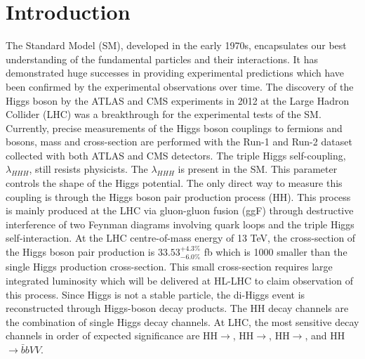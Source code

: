 \newpage
\chapter{Introduction}
\label{Intro}

The Standard Model (SM), developed in the early 1970s, encapsulates our best understanding of the fundamental particles and their interactions. It has demonstrated huge successes in providing experimental predictions which have been confirmed by the experimental observations over time. The discovery of the Higgs boson by the ATLAS and CMS experiments in 2012 at the Large Hadron Collider (LHC) was a breakthrough for the experimental tests of the SM. Currently, precise measurements of the Higgs boson couplings to fermions and bosons, mass and cross-section are performed with the Run-1 and Run-2 dataset collected with both ATLAS and CMS detectors. The triple Higgs self-coupling, $\lambda_{HHH}$, still resists physicists. The $\lambda_{HHH}$ is present in the SM. This parameter controls the shape of the Higgs potential. The only direct way to measure this coupling is through the Higgs boson pair production process (HH). This process is mainly produced at the LHC via gluon-gluon fusion (ggF) through destructive interference of two Feynman diagrams involving quark loops and the triple Higgs self-interaction. At the LHC centre-of-mass energy of 13 TeV, the cross-section of the Higgs boson pair production is $33.53_{-6.0\%}^{+4.3\%}$ fb which is 1000 smaller than the single Higgs production cross-section. This small cross-section requires large integrated luminosity which will be delivered at HL-LHC to claim observation of this process. Since Higgs is not a stable particle, the di-Higgs event is reconstructed through Higgs-boson decay products. The HH decay channels are the combination of single Higgs decay channels. At LHC, the most sensitive decay channels in order of expected significance are HH$\to$\bbtt, HH$\to$\bbyy,  HH$\to$\bbbb, and HH$\to\bar{b}bVV$. \\

